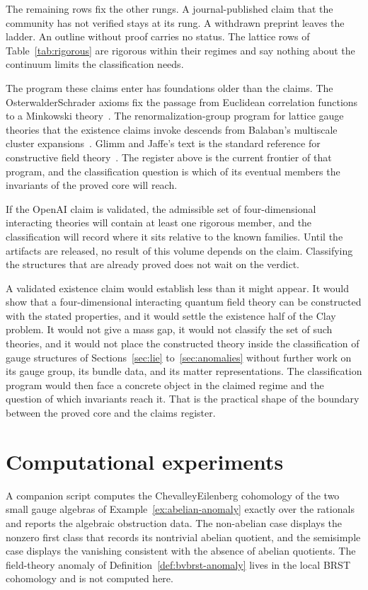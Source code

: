 \documentclass[11pt,letterpaper]{article}
\theoremstyle{definition}
\theoremstyle{remark}
\begin{document}
The remaining rows fix the other rungs. A journal-published claim that the community has not verified stays at its rung. A withdrawn preprint leaves the ladder. An outline without proof carries no status. The lattice rows of Table~\ref{tab:rigorous} are rigorous within their regimes and say nothing about the continuum limits the classification needs.

The program these claims enter has foundations older than the claims. The Osterwalder\textendash{}Schrader axioms fix the passage from Euclidean correlation functions to a Minkowski theory~\cite{osterwalder-schrader}. The renormalization-group program for lattice gauge theories that the existence claims invoke descends from Balaban's multiscale cluster expansions~\cite{balaban}. Glimm and Jaffe's text is the standard reference for constructive field theory~\cite{glimm-jaffe}. The register above is the current frontier of that program, and the classification question is which of its eventual members the invariants of the proved core will reach.

If the OpenAI claim is validated, the admissible set of four-dimensional interacting theories will contain at least one rigorous member, and the classification will record where it sits relative to the known families. Until the artifacts are released, no result of this volume depends on the claim. Classifying the structures that are already proved does not wait on the verdict.

A validated existence claim would establish less than it might appear. It would show that a four-dimensional interacting quantum field theory can be constructed with the stated properties, and it would settle the existence half of the Clay problem. It would not give a mass gap, it would not classify the set of such theories, and it would not place the constructed theory inside the classification of gauge structures of Sections~\ref{sec:lie} to~\ref{sec:anomalies} without further work on its gauge group, its bundle data, and its matter representations. The classification program would then face a concrete object in the claimed regime and the question of which invariants reach it. That is the practical shape of the boundary between the proved core and the claims register.

\section{Computational experiments}
\label{sec:experiments}

A companion script computes the Chevalley\textendash{}Eilenberg cohomology of the two small gauge algebras of Example~\ref{ex:abelian-anomaly} exactly over the rationals and reports the algebraic obstruction data. The non-abelian case displays the nonzero first class that records its nontrivial abelian quotient, and the semisimple case displays the vanishing consistent with the absence of abelian quotients. The field-theory anomaly of Definition~\ref{def:bvbrst-anomaly} lives in the local BRST cohomology and is not computed here.
\end{document}
